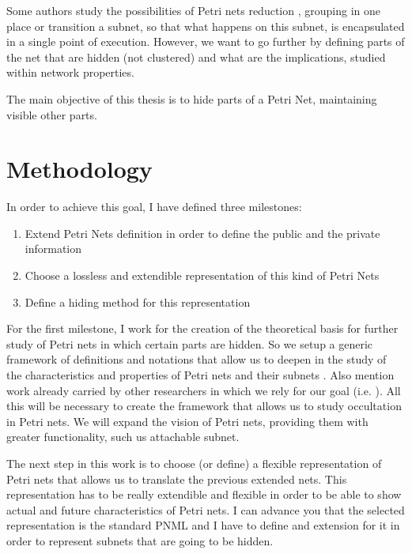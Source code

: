 Some authors study the possibilities of Petri nets reduction \citep{SN-Valette197935,SN-Suzuki198351,SN-Fahmy1990321,SN-DRUZHININVA19921922,SN-Fahmy1993127,R-Xia20111662}, grouping
in one place or transition a subnet, so that what happens
on this subnet, is encapsulated in a single point of execution. However,
we want to go further by defining parts of the net that are hidden (not clustered) and what are the implications, studied within
network properties.

The main objective of this thesis is to hide parts of a Petri Net, maintaining
visible other parts.


\section{Methodology}


In order to achieve this goal, I have defined three milestones:

\begin{enumerate}
\item
Extend Petri Nets definition in order to define the public and the private information 
\item
Choose a lossless and extendible representation
of this kind of Petri Nets
\item
Define a hiding method for this representation
\end{enumerate}



For the first milestone, I work for the creation
of the theoretical basis for further study of Petri nets
in which certain parts are hidden. So we setup
a generic framework of definitions and notations that allow us to deepen
in the study of the characteristics and properties of Petri nets and their
subnets \citep{G-Murata1989541,G-Silva1985}.
Also mention work already carried
by other researchers in which we rely for
our goal (i.e. \citep{SM-Silva19931,EPN-David2010,EPN-Jensen2009,G-EPN-Peterson1981}). All this will be necessary to create the framework that allows us to study occultation in Petri nets. We will expand the vision of Petri nets, providing them with greater functionality,
such us attachable subnet.

The next step in this work is to choose (or define) a flexible representation of Petri
nets that allows us to translate the previous extended nets. This representation has to be really extendible and flexible in order to be able to show actual and future characteristics of Petri nets.
I can advance you that the selected representation is the standard PNML and I have to define and extension for it in order to represent subnets that are going to
be hidden.

